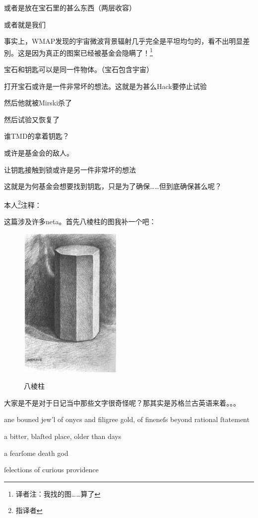 \documentclass[openany,a4paper]{book} %
\begin{document}
或者是放在宝石里的甚么东西（两层收容）

或者就是我们

事实上，WMAP发现的宇宙微波背景辐射几乎完全是平坦均匀的，看不出明显差別。这是因为真正的图案已经被基金会隐瞒了！\footnote{译者注：我找的图……算了}

宝石和钥匙可以是同一件物体。（宝石包含宇宙）

打开宝石或许是一件非常坏的想法。这就是为甚么Hack要停止试验

然后他就被Mirski杀了

然后试验又恢复了

谁TMD的拿着钥匙？

或许是基金会的敌人。

让钥匙接触到锁或许是另一件非常坏的想法

这就是为何基金会想要找到钥匙，只是为了确保……但到底确保甚么呢？\vspace{12pt}

本人\footnote{指译者}注释：\vspace{12pt}

这篇涉及许多neta。首先八棱柱的图我补一个吧：

\begin{figure}[H]
  \centering
  \includegraphics{Pic/SCP-001-4-1.jpg}\\
  \caption{八棱柱}\label{fig:SCP-001-4-1}
\end{figure}

大家是不是对于日记当中那些文字很奇怪呢？那其实是苏格兰古英语来着。。。

ane bouned jew'l of onycs and filigree gold, of fineneſs beyond rational ſtatement

a bitter, blaſted place, older than days

a fearſome death god

ſelections of curious providence
\end{document}
